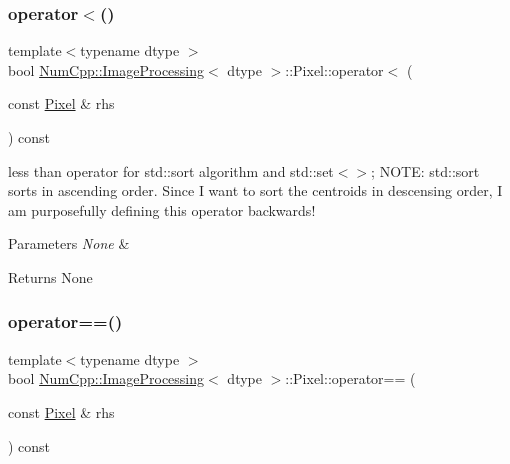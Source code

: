 \subsubsection{\texorpdfstring{operator$<$()}{operator<()}}
{\footnotesize\ttfamily template$<$typename dtype $>$ \\
bool \mbox{\hyperlink{class_num_cpp_1_1_image_processing}{Num\+Cpp\+::\+Image\+Processing}}$<$ dtype $>$\+::Pixel\+::operator$<$ (\begin{DoxyParamCaption}\item[{const \mbox{\hyperlink{class_num_cpp_1_1_image_processing_1_1_pixel}{Pixel}} \&}]{rhs }\end{DoxyParamCaption}) const\hspace{0.3cm}{\ttfamily [inline]}}

less than operator for std\+::sort algorithm and std\+::set$<$$>$; N\+O\+TE\+: std\+::sort sorts in ascending order. Since I want to sort the centroids in descensing order, I am purposefully defining this operator backwards!


\begin{DoxyParams}{Parameters}
{\em None} & \\
\hline
\end{DoxyParams}
\begin{DoxyReturn}{Returns}
None 
\end{DoxyReturn}
\mbox{\label{class_num_cpp_1_1_image_processing_1_1_pixel_a4b329520b239e27c9db284154356e818}} 
\subsubsection{\texorpdfstring{operator==()}{operator==()}}
{\footnotesize\ttfamily template$<$typename dtype $>$ \\
bool \mbox{\hyperlink{class_num_cpp_1_1_image_processing}{Num\+Cpp\+::\+Image\+Processing}}$<$ dtype $>$\+::Pixel\+::operator== (\begin{DoxyParamCaption}\item[{const \mbox{\hyperlink{class_num_cpp_1_1_image_processing_1_1_pixel}{Pixel}} \&}]{rhs }\end{DoxyParamCaption}) const\hspace{0.3cm}{\ttfamily [inline]}}

